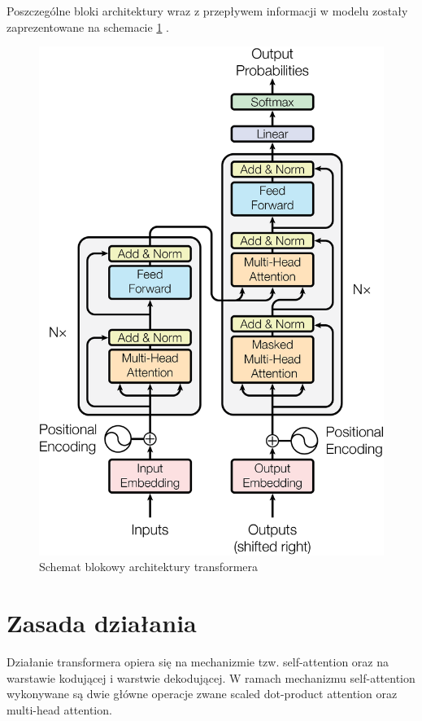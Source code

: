 \documentclass[12pt,a4paper,twoside]{book} %
\begin{document}
\pagebreak
Poszczególne bloki architektury wraz z przepływem informacji w modelu zostały zaprezentowane na schemacie \ref{fig:transformer_architecture} \cite{vaswani2023attentionneed}.

\begin{figure}[H]
    \centering
	\includegraphics[scale=0.20]{figs/architecture.png}
	\caption{Schemat blokowy architektury transformera}
	\label{fig:transformer_architecture}
\end{figure}

\section{Zasada działania}
Działanie transformera opiera się na mechanizmie tzw. self-attention oraz na warstawie kodującej i warstwie dekodującej.
W ramach mechanizmu self-attention wykonywane są dwie główne operacje zwane scaled dot-product attention oraz multi-head attention.
\end{document}
